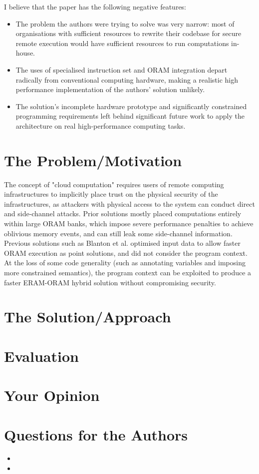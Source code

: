 \documentclass[11pt]{article}
\begin{document}
I believe that the paper has the following negative features:
\begin{itemize}
	\item The problem the authors were trying to solve was very narrow: most of organisations with sufficient resources to rewrite their codebase for secure remote execution would have sufficient resources to run computations in-house. 
	\item The uses of specialised instruction set and ORAM integration depart radically from conventional computing hardware, making a realistic high performance implementation of the authors' solution unlikely.
	\item The solution's incomplete hardware prototype and significantly constrained programming requirements left behind significant future work to apply the architecture on real high-performance computing tasks.
\end{itemize}

\section*{The Problem/Motivation}

The concept of "cloud computation" requires users of remote computing infrastructures to implicitly place trust on the physical security of the infrastructures, as attackers with physical access to the system can conduct direct and side-channel attacks. Prior solutions mostly placed computations entirely within large ORAM banks, which impose severe performance penalties to achieve oblivious memory events, and can still leak some side-channel information. Previous solutions such as Blanton et al. \cite{blanton2013data} optimised input data to allow faster ORAM execution as point solutions, and did not consider the program context. At the loss of some code generality (such as annotating variables and imposing more constrained semantics), the program context can be exploited to produce a faster ERAM-ORAM hybrid solution without compromising security.

\section*{The Solution/Approach}


\section*{Evaluation}


\section*{Your Opinion}


\section*{Questions for the Authors}

\begin{itemize}
	\item
	\item 
\end{itemize}


\footnotesize{}
\end{document}
